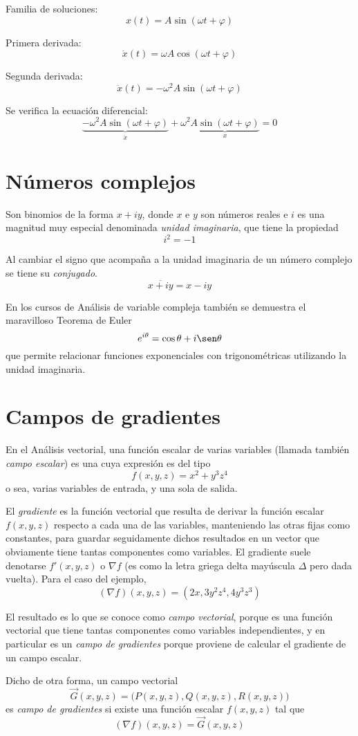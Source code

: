 \documentclass[a5paper,12pt,twoside]{book}
\begin{document}
Familia de soluciones:
\[ x(t) = A \sin{(\omega t + \varphi)} \]

Primera derivada:
\[ \dot{x}(t) = \omega A\cos{(\omega t + \varphi)} \]

Segunda derivada:
\[ \ddot{x}(t) = - \omega^2 A\sin{(\omega t + \varphi)} \]

Se verifica la ecuación diferencial:
\[ \underbrace{- \omega^2 A\sin{(\omega t + \varphi)}}_{\ddot{x}} + \omega^2 \underbrace{A \sin{(\omega t + \varphi)}}_{x} = 0 \]


\section{Números complejos}

Son binomios de la forma $x + iy$, donde $x$ e $y$ son números reales e $i$ es una magnitud muy especial denominada \emph{unidad imaginaria}, que tiene la propiedad
\[ i^2 = -1 \]

Al cambiar el signo que acompaña a la unidad imaginaria de un número complejo se tiene su \emph{conjugado}.
\[ \overline{x + iy} = x - iy \]

En los cursos de Análisis de variable compleja también se demuestra el maravilloso Teorema de Euler
\[ e^{i\theta} = \cos \theta + i \sen \theta \]
que permite relacionar funciones exponenciales con trigonométricas utilizando la unidad imaginaria.


\section{Campos de gradientes}

En el Análisis vectorial, una función escalar de varias variables (llamada también \emph{campo escalar}) es una cuya expresión es del tipo
\[ f(x, y, z) = x^2 + y^3 z^4 \]
o sea, varias variables de entrada, y una sola de salida.

El \emph{gradiente} es la función vectorial que resulta de derivar la función escalar $f(x, y, z)$ respecto a cada una de las variables, manteniendo las otras fijas como constantes, para guardar seguidamente dichos resultados en un vector que obviamente tiene tantas componentes como variables.
El gradiente suele denotarse $f'(x,y,z)$ o $\nabla f$ (es como la letra griega delta mayúscula $\Delta$ pero dada vuelta).
Para el caso del ejemplo,
\[ \left(\nabla f\right)\!(x, y, z) = \left( 2x, 3 y^2 z^4, 4 y^3 z^3 \right) \]

El resultado es lo que se conoce como \emph{campo vectorial}, porque es una función vectorial que tiene tantas componentes como variables independientes, y en particular es un \emph{campo de gradientes} porque proviene de calcular el gradiente de un campo escalar.


Dicho de otra forma, un campo vectorial
\[ \Vec{G}(x, y, z) = \Big( P(x, y, z), Q(x, y, z), R(x, y, z) \Big) \]
es \emph{campo de gradientes} si existe una función escalar $f(x, y, z)$ tal que
\[ \left(\nabla f\right)\!(x, y, z) = \Vec{G}(x, y, z) \]
\end{document}
